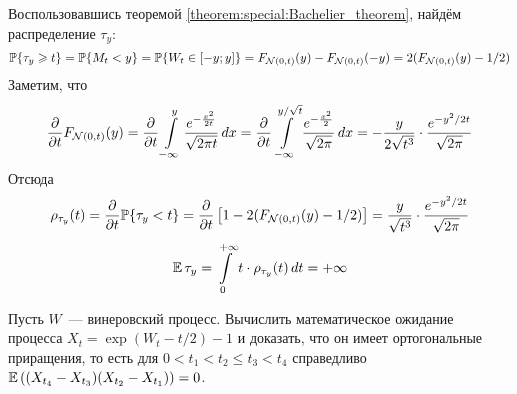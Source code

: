 \begin{solution}
    Воспользовавшись теоремой \ref{theorem:special:Bachelier_theorem},
    найдём распределение $ \tau_y $:
    \[
        \mathbb{P} \{ \tau_y \geqslant t \} = \mathbb{P} \{ M_t < y \} = \mathbb{P} \{ W_t \in [-y; y] \} = F_{\mathcal{N}(0, t)}(y) - F_{\mathcal{N}(0, t)}(-y) = 2 (F_{\mathcal{N}(0, t)}(y) - 1/2)
    \]
    Заметим, что
    \[
        \frac{\partial}{\partial t} F_{\mathcal{N}(0, t)}(y) = \frac{\partial}{\partial t} \int\limits_{-\infty}^y \frac{e^{-\frac{x^2}{2 t}}}{\sqrt{2 \pi t}} \, dx =
        \frac{\partial}{\partial t} \int\limits_{-\infty}^{y / \sqrt{t}} \frac{e^{-\frac{x^2}{2}}}{\sqrt{2 \pi}} \, dx = - \frac{y}{2 \sqrt{t^3}} \cdot \frac{e^{-y^2 / 2t}}{\sqrt{2 \pi}}
    \]
    Отсюда
    \[
        \rho_{\tau_y}(t) = \frac{\partial}{\partial t} \mathbb{P} \{ \tau_y < t \} = \frac{\partial}{\partial t} \left[ 1 - 2 (F_{\mathcal{N}(0, t)}(y) - 1/2) \right] = \frac{y}{\sqrt{t^3}} \cdot \frac{e^{-y^2 / 2t}}{\sqrt{2 \pi}}
    \]
    \[
        \operatorname{\mathbb{E}} \tau_y = \int\limits_0^{+\infty} t \cdot \rho_{\tau_y}(t) \, dt = + \infty
    \]
\end{solution}


\begin{exercise}
    \label{exercise:special:exponentiated_Wiener_process}
    Пусть $ W $~--- винеровский процесс.
    Вычислить математическое ожидание процесса $ X_t = \exp(W_t - t/2) - 1 $ и доказать,
    что он имеет ортогональные приращения,
    то есть для $ 0 < t_1 < t_2 \leqslant t_3 < t_4 $ справедливо $ \operatorname{\mathbb{E}} \left( (X_{t_4} - X_{t_3})(X_{t_2} - X_{t_1}) \right) = 0 $.
\end{exercise}

